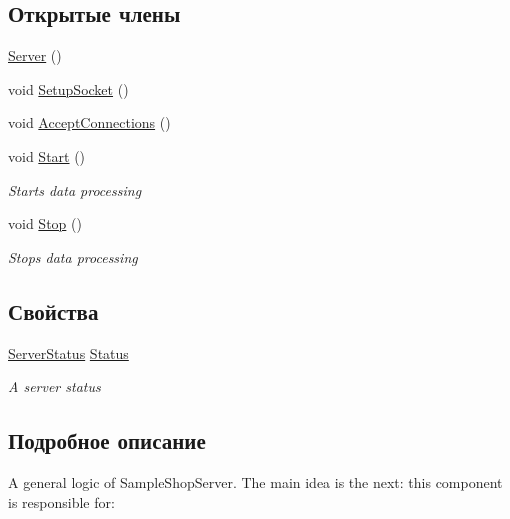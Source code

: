 \subsection*{Открытые члены}
\begin{DoxyCompactItemize}
\item 
\hyperlink{class_sample_shop_server_1_1_server_1_1_server_a07d76048d77e7256ded3491bec8c7349}{Server} ()
\item 
void \hyperlink{class_sample_shop_server_1_1_server_1_1_server_a2b33d91f4e6c1ddb738e8edf35e4c6ad}{Setup\+Socket} ()
\item 
void \hyperlink{class_sample_shop_server_1_1_server_1_1_server_a48f91845058dd02bbfc50ea05d367328}{Accept\+Connections} ()
\item 
void \hyperlink{class_sample_shop_server_1_1_server_1_1_server_a910c619c51f72e62fd63cab0f86f3794}{Start} ()
\begin{DoxyCompactList}\small\item\em Starts data processing \end{DoxyCompactList}\item 
void \hyperlink{class_sample_shop_server_1_1_server_1_1_server_a4ed8200e4639be747e090bee9e8fcf0a}{Stop} ()
\begin{DoxyCompactList}\small\item\em Stops data processing \end{DoxyCompactList}\end{DoxyCompactItemize}
\subsection*{Свойства}
\begin{DoxyCompactItemize}
\item 
\hyperlink{class_sample_shop_server_1_1_server_1_1_server_a0b89d20b2f19ee5580acbbc73887bb6b}{Server\+Status} \hyperlink{class_sample_shop_server_1_1_server_1_1_server_aa981a1322bbc9aa773a9aa46346e385d}{Status}
\begin{DoxyCompactList}\small\item\em A server status \end{DoxyCompactList}\end{DoxyCompactItemize}


\subsection{Подробное описание}
A general logic of Sample\+Shop\+Server. The main idea is the next\+: this component is responsible for\+: 



